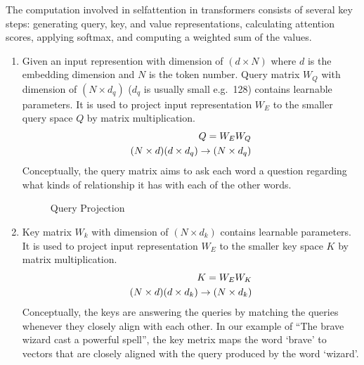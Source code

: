 \documentclass[letterpaper,11pt,english]{sphinxmanual}
\begin{document}
\begin{figure}[htbp]
\centering

\noindent{}
\end{figure}

\sphinxAtStartPar
The computation involved in self\sphinxhyphen{}attention in transformers consists of
several key steps: generating query, key, and value representations,
calculating attention scores, applying softmax, and computing a weighted
sum of the values.
\begin{enumerate}
%
\item {} 
\sphinxAtStartPar
{}

\sphinxAtStartPar
Given an input represention with dimension of \((d \times N)\)
where \(d\) is the embedding dimension and \(N\) is the token
number. Query matrix \(W_Q\) with dimension of
\((N \times d_q)\) (\(d_q\) is usually small e.g. 128)
contains learnable parameters. It is used to project input
representation \(W_E\) to the smaller query space \(Q\) by
matrix multiplication.
\begin{equation*}
\begin{split}Q = W_E W_Q\\ \space(N\times d)(d\times d_q) \rightarrow (N \times d_q)\end{split}
\end{equation*}
\sphinxAtStartPar
Conceptually, the query matrix aims to ask each word a question
regarding what kinds of relationship it has with each of the other
words.

\begin{figure}[htbp]
\centering
\capstart

\noindent{}
\caption{Query Projection}\label{\detokenize{pretraining:id8}}\end{figure}

\item {} 
\sphinxAtStartPar
{}

\sphinxAtStartPar
Key matrix \(W_k\) with dimension of \((N \times d_k)\)
contains learnable parameters. It is used to project input
representation \(W_E\) to the smaller key space \(K\) by
matrix multiplication.
\begin{equation*}
\begin{split}K = W_E W_K \\ \space (N \times d) (d \times d_k) \rightarrow (N \times d_k)\end{split}
\end{equation*}
\sphinxAtStartPar
Conceptually, the keys are answering the queries by matching the
queries whenever they closely align with each other. In our example
of “The brave wizard cast a powerful spell”, the key metrix maps the
word ‘brave’ to vectors that are closely aligned with the query
produced by the word ‘wizard’.


\end{enumerate}
\end{document}
